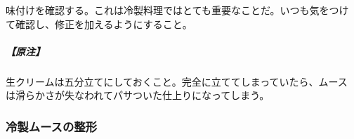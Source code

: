 \begin{recette}
味付けを確認する。これは冷製料理ではとても重要なことだ。いつも気をつけ
て確認し、修正を加えるようにすること。

\hypertarget{nota-composition-de-l-appareil-pour-mousses-et-mousseline-froides}{%
\subparagraph{【原注】}\label{nota-composition-de-l-appareil-pour-mousses-et-mousseline-froides}}

生クリームは五分立てにしておくこと。完全に立ててしまっていたら、ムース
は滑らかさが失なわれてパサついた仕上りになってしまう。

\hypertarget{ux51b7ux88fdux30e0ux30fcux30b9ux306eux6574ux5f62}{%
\subsubsection{冷製ムースの整形}\label{ux51b7ux88fdux30e0ux30fcux30b9ux306eux6574ux5f62}}

\end{recette}